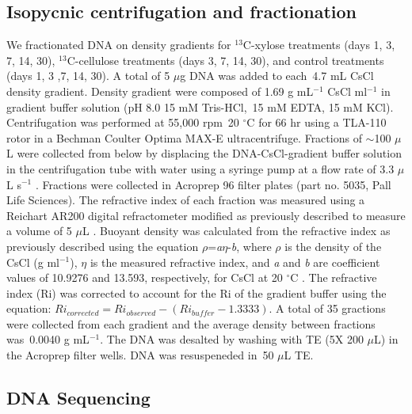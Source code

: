 \documentclass{article}
\begin{document}
\subsection{Isopycnic centrifugation and fractionation} 
We fractionated DNA on density gradients for $^{13}$C-xylose treatments (days
1, 3, 7, 14, 30), $^{13}$C-cellulose treatments (days 3, 7, 14, 30), and
control treatments (days 1, 3 ,7, 14, 30). A total of 5 $\mu$g DNA was added to
each~4.7 mL CsCl density gradient.  Density gradient were composed of 1.69
g mL$^{-1}$ CsCl ml$^{-1}$ in gradient buffer solution (pH 8.0 15 mM
Tris-HCl,~15 mM EDTA, 15 mM KCl). Centrifugation was performed at 55,000 rpm~20
$^{\circ}$C for 66 hr using a TLA-110 rotor in a Bechman Coulter Optima MAX-E
ultracentrifuge. Fractions of $\sim$100 $\mu$L were collected from below by
displacing the DNA-CsCl-gradient buffer solution in the centrifugation tube
with water using a syringe pump at a flow rate of 3.3 $\mu$L s$^{-1}$
\citep{Manefield_2002}. Fractions were collected in Acroprep 96 filter plates (part no. 5035, Pall Life
Sciences). The refractive index of each fraction was measured using a Reichart
AR200 digital refractometer modified as previously described to measure
a volume of 5 $\mu$L \citep{Buckley_2007}. Buoyant density was calculated from
the refractive index as previously described \citep{Buckley_2007} using the
equation $\rho$=\textit{a}$\eta$-\textit{b}, where $\rho$ is the density of the
CsCl (g ml$^{-1}$), $\eta$ is the measured refractive index, and \textit{a} and
\textit{b} are coefficient values of 10.9276 and 13.593, respectively, for CsCl
at 20 $^{\circ}$C \citep{9780408708036}. The refractive index (Ri) was
corrected to account for the Ri of the gradient buffer using the equation: 
$Ri_{corrected} = Ri_{observed} - (Ri_{buffer} - 1.3333)$. A total of 35
gractions were collected from each gradient and the average density between
fractions was~0.0040 g mL$^{-1}$. The DNA was desalted by washing with TE (5X
200 $\mu$L) in the Acroprep filter wells. DNA was resuspeneded in~50 $\mu$L TE. 

\subsection{DNA Sequencing}
\end{document}
